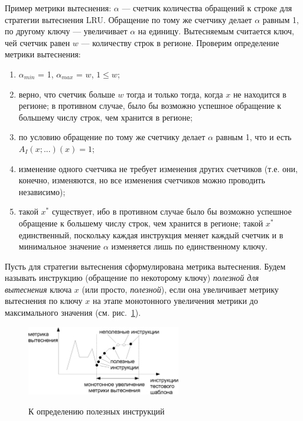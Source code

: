 \documentclass[14pt]{extreport}
\newcommand{\LRU}{\textsf{LRU}\xspace}
\begin{document}
Пример метрики вытеснения: $\alpha$ --- счетчик количества обращений к строке
для стратегии вытеснения \LRU. Обращение по тому же счетчику делает $\alpha$
равным 1, по другому ключу --- увеличивает $\alpha$ на единицу. Вытесняемым
считается ключ, чей счетчик равен $w$ --- количеству строк в регионе. Проверим
определение метрики вытеснения:
\begin{enumerate}
    \item $\alpha_{min}$ = 1, $\alpha_{max}$ = $w$, $1 \leqslant w$;
    \item верно, что счетчик больше $w$ тогда и только тогда, когда $x$ не
находится в регионе; в противном случае, было бы возможно успешное обращение к
большему числу строк, чем хранится в регионе;
    \item по условию обращение по тому же счетчику делает $\alpha$ равным 1, что
и есть $A_I(x;...)(x) = 1$;
    \item изменение одного счетчика не требует изменения других счетчиков (т.е.
они, конечно, изменяются, но все изменения счетчиков можно проводить
независимо);
    \item такой $x^*$ существует, ибо в противном случае было бы возможно
успешное обращение к большему числу строк, чем хранится в регионе; такой $x^*$
единственный, поскольку каждая инструкция меняет каждый счетчик и в минимальное
значение $\alpha$ изменяется лишь по единственному ключу.
\end{enumerate}

Пусть для стратегии вытеснения сформулирована метрика вытеснения. Будем называть
инструкцию (обращение по некоторому ключу) \emph{полезной для вытеснения} ключа
$x$ (или просто, \emph{полезной}), если она увеличивает метрику вытеснения по
ключу $x$ на этапе монотонного увеличения метрики до максимального значения (см.
рис.~\ref{useful}).

\begin{figure}[h] \center
  \includegraphics[width=0.6\textwidth]{2.theor/useful}\\
  \caption{К определению полезных инструкций}\label{useful}
\end{figure}
\end{document}
